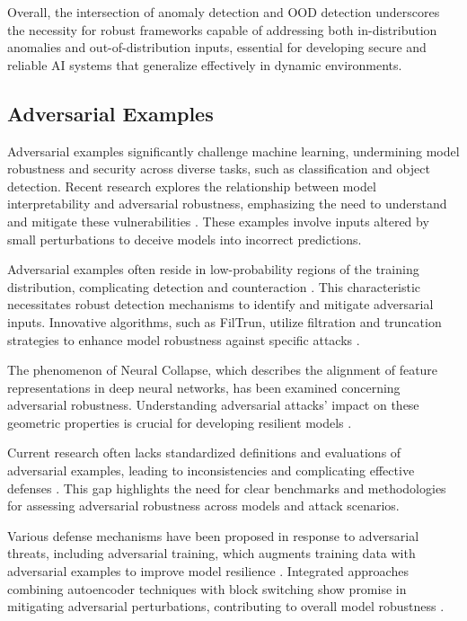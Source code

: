 Overall, the intersection of anomaly detection and OOD detection underscores the necessity for robust frameworks capable of addressing both in-distribution anomalies and out-of-distribution inputs, essential for developing secure and reliable AI systems that generalize effectively in dynamic environments.

\subsection{Adversarial Examples} \label{subsec:Adversarial Examples}

Adversarial examples significantly challenge machine learning, undermining model robustness and security across diverse tasks, such as classification and object detection. Recent research explores the relationship between model interpretability and adversarial robustness, emphasizing the need to understand and mitigate these vulnerabilities \cite{liu2020adversarialattacksdefensesinterpretation}. These examples involve inputs altered by small perturbations to deceive models into incorrect predictions.

Adversarial examples often reside in low-probability regions of the training distribution, complicating detection and counteraction \cite{song2018pixeldefendleveraginggenerativemodels}. This characteristic necessitates robust detection mechanisms to identify and mitigate adversarial inputs. Innovative algorithms, such as FilTrun, utilize filtration and truncation strategies to enhance model robustness against specific attacks \cite{delgosha2021robustclassificationell0attack}.

The phenomenon of Neural Collapse, which describes the alignment of feature representations in deep neural networks, has been examined concerning adversarial robustness. Understanding adversarial attacks' impact on these geometric properties is crucial for developing resilient models \cite{su2024robustnessneuralcollapseneural}.

Current research often lacks standardized definitions and evaluations of adversarial examples, leading to inconsistencies and complicating effective defenses \cite{Out-of-Dis0}. This gap highlights the need for clear benchmarks and methodologies for assessing adversarial robustness across models and attack scenarios.

Various defense mechanisms have been proposed in response to adversarial threats, including adversarial training, which augments training data with adversarial examples to improve model resilience \cite{arous2023noiseyouadversarialtraining}. Integrated approaches combining autoencoder techniques with block switching show promise in mitigating adversarial perturbations, contributing to overall model robustness \cite{yadav2022integratedautoencoderblockswitching}.

